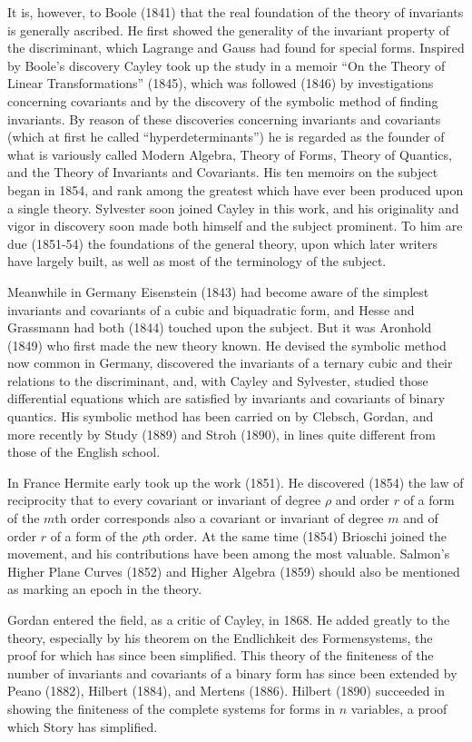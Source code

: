 \documentclass[oneside]{book}
\begin{document}
It is, however, to Boole (1841) that the real foundation of the
theory of invariants is generally ascribed. He first showed the
generality of the invariant property of the discriminant, which
Lagrange and Gauss had found for special forms. Inspired by Boole's
discovery Cayley took up the study in a memoir ``On the Theory of
Linear Transformations'' (1845), which was followed (1846) by
investigations concerning covariants and by the discovery of the
symbolic method of finding invariants. By reason of these
discoveries concerning invariants and covariants (which at first he
called ``hyperdeterminants'') he is regarded as the founder of what
is variously called Modern Algebra, Theory of Forms, Theory of
Quantics, and the Theory of Invariants and Covariants. His ten
memoirs on the subject began in 1854, and rank among the greatest
which have ever been produced upon a single theory. Sylvester soon
joined Cayley in this work, and his originality and vigor in
discovery soon made both himself and the subject prominent. To him
are due (1851-54) the foundations of the general theory, upon which
later writers have largely built, as well as most of the terminology
of the subject.

Meanwhile in Germany Eisenstein (1843) had become aware of the
simplest invariants and covariants of a cubic and biquadratic form,
and Hesse and Grassmann had both (1844) touched upon the
subject. But it was Aronhold (1849) who first made the new theory
known. He devised the symbolic method now common in Germany,
discovered the invariants of a ternary cubic and their relations to
the discriminant, and, with Cayley and Sylvester, studied those
differential equations which are satisfied by invariants and
covariants of binary quantics. His symbolic method has been carried
on by Clebsch, Gordan, and more recently by Study (1889) and Stroh
(1890), in lines quite different from those of the English school.

In France Hermite early took up the work (1851). He discovered
(1854) the law of reciprocity that to every covariant or invariant
of degree $\rho$ and order $r$ of a form of the $m$th order
corresponds also a covariant or invariant of degree $m$ and of order
$r$ of a form of the $\rho$th order. At the same time (1854)
Brioschi joined the movement, and his contributions have been among
the most valuable. Salmon's Higher Plane Curves (1852) and Higher
Algebra (1859) should also be mentioned as marking an epoch in the
theory.

Gordan entered the field, as a critic of Cayley, in 1868. He added
greatly to the theory, especially by his theorem on the Endlichkeit
des Formensystems, the proof for which has since been
simplified. This theory of the finiteness of the number of
invariants and covariants of a binary form has since been extended
by Peano (1882), Hilbert (1884), and Mertens (1886). Hilbert (1890)
succeeded in showing the finiteness of the complete systems for
forms in $n$ variables, a proof which Story has simplified.
\end{document}

